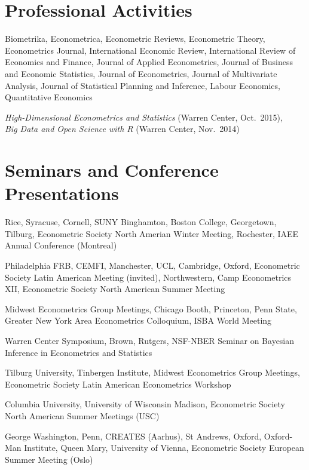\documentclass[line,overlapped]{myres}
\begin{document}
\begin{resume}
\section{\sc Professional Activities}

\begin{description}[style=multiline,leftmargin=3cm,font=\normalfont]
  \item[Refereeing:] Biometrika, Econometrica, Econometric Reviews, Econometric Theory, Econometrics Journal, International Economic Review, International Review of Economics and Finance, Journal of Applied Econometrics, Journal of Business and Economic Statistics, Journal of Econometrics, Journal of Multivariate Analysis, Journal of Statistical Planning and Inference, Labour Economics, Quantitative Economics 
  \item[Workshops \\ Organized:]
    \emph{High-Dimensional Econometrics and Statistics} (Warren Center, Oct.\ 2015), \\
    \emph{Big Data and Open Science with R} (Warren Center, Nov.\ 2014)
\end{description}



\section{\sc Seminars and Conference Presentations}

\begin{description}[style=multiline,leftmargin=2cm,font=\normalfont]
  \item[2017--2018:] Rice, Syracuse, Cornell, SUNY Binghamton, Boston College, Georgetown, Tilburg, Econometric Society North Amerian Winter Meeting, Rochester, IAEE Annual Conference (Montreal)
\item[2016--2017:] Philadelphia FRB, CEMFI, Manchester, UCL, Cambridge, Oxford, Econometric Society Latin American Meeting (invited), Northwestern, Camp Econometrics XII, Econometric Society North American Summer Meeting
\item[2015--2016:] Midwest Econometrics Group Meetings, Chicago Booth, Princeton, Penn State, Greater New York Area Econometrics Colloquium, ISBA World Meeting 
\item[2014--2015:] Warren Center Symposium, Brown, Rutgers, NSF-NBER Seminar on Bayesian Inference in Econometrics and Statistics 
\item[2013--2014:] Tilburg University, Tinbergen Institute, Midwest Econometrics Group Meetings, Econometric Society Latin American Econometrics Workshop
\item[2012--2013:] Columbia University, University of Wisconsin Madison, Econometric Society North American Summer Meetings (USC)
\item[2011--2012:] George Washington, Penn, CREATES (Aarhus), St Andrews, Oxford, Oxford-Man Institute, Queen Mary, University of Vienna, Econometric Society European Summer Meeting (Oslo)
\end{description}



\end{resume}
\end{document}
